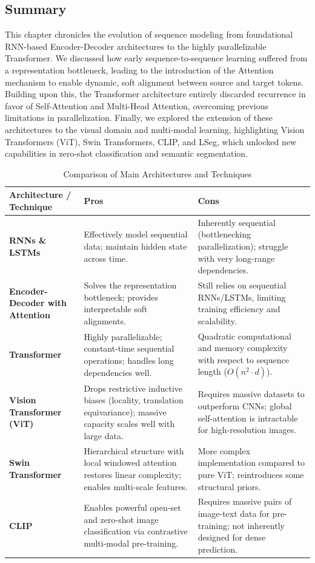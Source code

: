 \subsection{Summary}
This chapter chronicles the evolution of sequence modeling from foundational RNN-based Encoder-Decoder architectures to the highly parallelizable Transformer. We discussed how early sequence-to-sequence learning suffered from a representation bottleneck, leading to the introduction of the Attention mechanism to enable dynamic, soft alignment between source and target tokens. Building upon this, the Transformer architecture entirely discarded recurrence in favor of Self-Attention and Multi-Head Attention, overcoming previous limitations in parallelization. Finally, we explored the extension of these architectures to the visual domain and multi-modal learning, highlighting Vision Transformers (ViT), Swin Transformers, CLIP, and LSeg, which unlocked new capabilities in zero-shot classification and semantic segmentation.

\begin{table}[h]
\centering
\begin{tabularx}{\textwidth}{| >{\centering\arraybackslash}m{3.5cm} | X | X |}
\hline
\textbf{Architecture / Technique} & \textbf{Pros} & \textbf{Cons} \\
\hline
\textbf{RNNs \& LSTMs} & Effectively model sequential data; maintain hidden state across time. & Inherently sequential (bottlenecking parallelization); struggle with very long-range dependencies. \\
\hline
\textbf{Encoder-Decoder with Attention} & Solves the representation bottleneck; provides interpretable soft alignments. & Still relies on sequential RNNs/LSTMs, limiting training efficiency and scalability. \\
\hline
\textbf{Transformer} & Highly parallelizable; constant-time sequential operations; handles long dependencies well. & Quadratic computational and memory complexity with respect to sequence length ($O(n^2 \cdot d)$). \\
\hline
\textbf{Vision Transformer (ViT)} & Drops restrictive inductive biases (locality, translation equivariance); massive capacity scales well with large data. & Requires massive datasets to outperform CNNs; global self-attention is intractable for high-resolution images. \\
\hline
\textbf{Swin Transformer} & Hierarchical structure with local windowed attention restores linear complexity; enables multi-scale features. & More complex implementation compared to pure ViT; reintroduces some structural priors. \\
\hline
\textbf{CLIP} & Enables powerful open-set and zero-shot image classification via contrastive multi-modal pre-training. & Requires massive pairs of image-text data for pre-training; not inherently designed for dense prediction. \\
\hline
\end{tabularx}
\caption{Comparison of Main Architectures and Techniques}
\label{tab:architecture_comparison}
\end{table}

